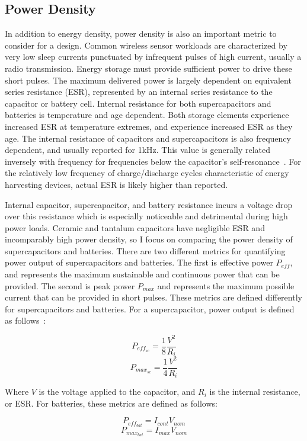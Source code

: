 \subsection{Power Density}
In addition to energy density, power density is also an important metric to consider for a design. 
Common wireless sensor workloads are characterized by very low sleep currents punctuated by infrequent pulses of high current, usually a radio transmission. Energy storage must provide sufficient power to drive these short pulses. The maximum delivered power is largely dependent on equivalent series resistance (ESR), represented by an internal series resistance to the capacitor or battery cell. 
Internal resistance for both supercapacitors and batteries is temperature and age dependent. Both storage elements experience increased ESR at temperature extremes, and experience increased ESR as they age.
The internal resistance of capacitors and supercapacitors is also frequency dependent, and usually reported for 1\si{\kilo\hertz}. This value is generally related inversely with frequency for frequencies below the capacitor's self-resonance~\cite{murataESRArticle}. For the relatively low frequency of charge/discharge cycles characteristic of energy harvesting devices, actual ESR is likely higher than reported.

Internal capacitor, supercapacitor, and battery resistance incurs a voltage drop over this resistance which is especially noticeable and detrimental during high power loads.
Ceramic and tantalum capacitors have negligible ESR and incomparably high power density, so I focus on comparing the power density of supercapacitors and batteries.
There are two different metrics for quantifying power output of supercapacitors and batteries. The first is effective power $P_{eff}$, and represents the maximum sustainable and continuous power that can be provided. The second is peak power $P_{max}$ and represents the maximum possible current that can be provided in short pulses. These metrics are defined differently for supercapacitors and batteries. For a supercapacitor, power output is defined as follows~\cite{IEC62391}:

$$P_{eff_{sc}} = \frac{1}{8} \frac{V^2}{R_i}$$
$$P_{max_{sc}} = \frac{1}{4} \frac{V^2}{R_i}$$

Where $V$ is the voltage applied to the capacitor, and $R_i$ is the internal resistance, or ESR. For batteries, these metrics are defined as follows:

$$P_{eff_{bat}} = I_{cont} V_{nom}$$
$$P_{max_{bat}} = I_{max} V_{nom}$$

